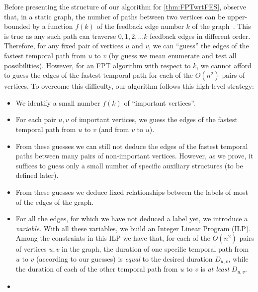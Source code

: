 \documentclass[a4paper,UKenglish,cleveref, autoref, thm-restate]{lipics-v2021}
\newcommand{\ie}{i.\,e.,\ }
\newcommand{\deltaExact}{\textsc{Simple TGR}}
\begin{document}
Before presenting the structure of our algorithm for \cref{thm:FPTwrtFES}, observe that, in a static graph, the number of paths between two vertices can be upper-bounded by a function $f(k)$ of the feedback edge number $k$ of the graph~\cite{casteigts2021finding}.
This is true as any such path can traverse $0,1,2,\dots k$ feedback edges in different order.
Therefore, for any fixed pair of vertices $u$ and $v$, we can ``guess'' the edges of the fastest temporal path from $u$ to $v$
(by guess we mean enumerate and test all possibilities).
However, 
for an FPT algorithm with respect to $k$, we cannot afford to guess the edges of the fastest temporal path for each of the $O(n^2)$ pairs of vertices. 
To overcome this difficulty, our algorithm follows this high-level strategy:
\begin{itemize}
    \item We identify a small number $f(k)$ of ``important vertices''.%
    \item For each pair $u,v$ of important vertices, we guess the edges of the fastest temporal path from $u$ to $v$ (and from $v$ to $u$).
    \item From these guesses we can still not deduce the edges of the fastest temporal paths between many pairs of non-important vertices. However, as we prove, it suffices to guess only a small number of specific auxiliary structures (to be defined later).
    \item From these guesses we deduce fixed relationships between the labels of most of the edges of the graph. 
    \item For all the edges, for which we have not deduced a label yet, we introduce a \emph{variable}. With all these variables, we build an Integer Linear Program (ILP). 
    Among the constraints in this ILP we have that, for each of the $O(n^2)$ pairs of vertices $u,v$ in the graph, the duration of one specific temporal path from $u$ to $v$ (according to our guesses) is \emph{equal} to the desired duration $D_{u,v}$, while the duration of each of the other temporal path from $u$ to $v$ is \emph{at least} $D_{u,v}$.
    \item 

\end{itemize}
\end{document}
